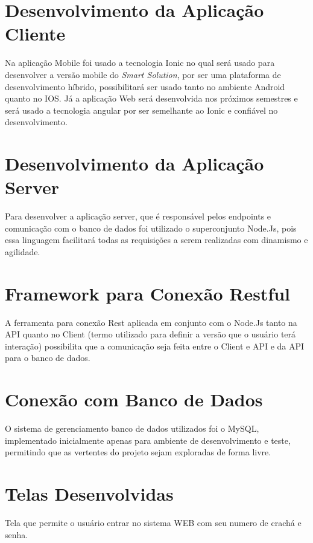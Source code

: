 \section{Desenvolvimento da Aplicação Cliente}
Na aplicação Mobile foi usado a tecnologia Ionic no qual será usado para desenvolver a versão mobile do \textit{Smart Solution}, por ser uma plataforma de desenvolvimento híbrido, possibilitará ser usado tanto no ambiente Android quanto no IOS. Já a aplicação Web será desenvolvida nos próximos semestres e será usado a tecnologia angular por ser semelhante ao Ionic e confiável no desenvolvimento.

\section{Desenvolvimento da Aplicação Server}
Para desenvolver a aplicação server, que é responsável pelos endpoints e comunicação com o banco de dados foi utilizado o superconjunto Node.Js, pois essa linguagem facilitará todas as requisições a serem realizadas com dinamismo e agilidade.
\section{Framework para Conexão Restful}
A ferramenta para conexão Rest aplicada em conjunto com o Node.Js tanto na API quanto no Client (termo utilizado para definir a versão que o usuário terá interação) possibilita que a comunicação seja feita entre o Client e API e da API para o banco de dados.
\section{Conexão com Banco de Dados}
O sistema de gerenciamento banco de dados utilizados foi o MySQL, implementado inicialmente apenas para ambiente de desenvolvimento e teste, permitindo que as vertentes do projeto sejam exploradas de forma livre.
\newpage
\section{Telas Desenvolvidas}



Tela que permite o usuário entrar no sistema WEB com seu numero de crachá e senha.

